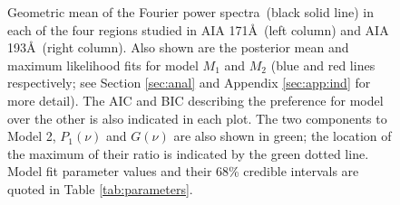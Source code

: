 \documentclass{aastex}
\newcommand{\PA}{power spectra}
\newcommand{\Fpa}{Fourier \PA}
\begin{document}
\begin{figure}
\centerline{
}
\centerline{
}
\centerline{
}
\centerline{
}
\caption{Geometric mean of the \protect\Fpa\ (black solid line) in
  each of the four regions studied in AIA 171\AA\ (left column) and
  AIA 193\AA\ (right column).  Also shown are the posterior mean and
  maximum likelihood fits for model $M_{1}$ and $M_{2}$ (blue and red
  lines respectively; see Section \ref{sec:anal} and Appendix
  \ref{sec:app:ind} for more detail).  The AIC and BIC describing the
  preference for model over the other is also indicated in each plot.
  The two components to Model 2, $P_{1}(\nu)$ and $G(\nu)$ are also
  shown in green; the location of the maximum of their ratio is
  indicated by the green dotted line.  Model fit parameter values and
  their 68\% credible intervals are quoted in Table
  \ref{tab:parameters}.}
\label{fig:fit171193}
\end{figure}
\end{document}
